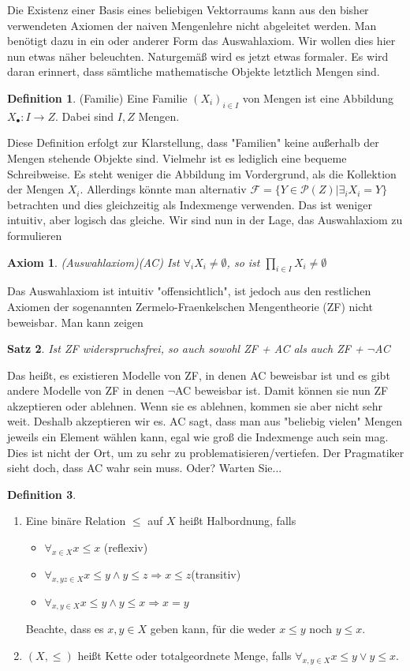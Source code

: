 \documentclass[12pt,a4paper]{article}
\newtheorem{theorem}{Satz}
\newtheorem{axiom}{Axiom}
\theoremstyle{definition}
\newtheorem{definition}[theorem]{Definition}
\theoremstyle{remark}
\begin{document}
		Die Existenz einer Basis eines beliebigen Vektorraums kann aus den bisher verwendeten Axiomen der naiven Mengenlehre nicht abgeleitet werden. Man benötigt dazu in ein oder anderer Form das Auswahlaxiom. Wir wollen dies hier nun etwas näher beleuchten. Naturgemäß wird es jetzt etwas formaler. Es wird daran erinnert, dass sämtliche mathematische Objekte letztlich Mengen sind.
		\begin{definition}{(Familie)}
			Eine Familie $(X_i)_{i \in I}$ von Mengen ist eine Abbildung $X_{\bullet}: I \rightarrow Z$. Dabei sind $I, Z$ Mengen.
		\end{definition}
		Diese Definition erfolgt zur Klarstellung, dass "Familien" keine außerhalb der Mengen stehende Objekte sind.
		Vielmehr ist es lediglich eine bequeme Schreibweise. Es steht weniger die Abbildung im Vordergrund, als die Kollektion der Mengen $X_i$. Allerdings könnte man alternativ $\mathcal{F} = \{ Y \in \mathcal{P}(Z) | \exists_i X_i = Y \}$ betrachten und dies gleichzeitig als Indexmenge verwenden.
		Das ist weniger intuitiv, aber logisch das gleiche.
		Wir sind nun in der Lage, das Auswahlaxiom zu formulieren
		\begin{axiom}{(Auswahlaxiom)(AC)}
			Ist $\forall_i X_i \neq \emptyset$, so ist $\prod_{i \in I} X_i \neq \emptyset$
		\end{axiom}
		Das Auswahlaxiom ist intuitiv "offensichtlich", ist jedoch aus den restlichen Axiomen der sogenannten Zermelo-Fraenkelschen Mengentheorie (ZF) nicht beweisbar. Man kann zeigen
		\begin{theorem}
			Ist ZF widerspruchsfrei, so auch sowohl ZF + AC als auch ZF + $\lnot$AC
		\end{theorem}
		Das heißt, es existieren Modelle von ZF, in denen AC beweisbar ist und es gibt andere Modelle von ZF in denen $\lnot$AC beweisbar ist. Damit können sie nun ZF akzeptieren oder ablehnen. Wenn sie es ablehnen, kommen sie aber nicht sehr weit. Deshalb akzeptieren wir es.
		AC sagt, dass man aus "beliebig vielen" Mengen jeweils ein Element wählen kann, egal wie groß die Indexmenge auch sein mag. Dies ist nicht der Ort, um zu sehr zu problematisieren/vertiefen. Der Pragmatiker sieht doch, dass AC wahr sein muss. Oder? Warten Sie...
		\begin{definition}
			\begin{enumerate}
				\item 
					Eine binäre Relation $\leq$ auf $X$ heißt Halbordnung, falls
					\begin{itemize}
						\item 
							$\forall_{x \in X} x \leq x$ (reflexiv)
						\item
							$\forall_{x,yz \in X} x \leq y \land  y \leq z \Rightarrow x \leq z$(transitiv)
						\item
							$\forall_{x,y \in X} x \leq y \land y \leq x \Rightarrow x =y$
					\end{itemize}
					Beachte, dass es $x,y \in X$ geben kann, für die weder $x \leq y$ noch $y \leq x$.
				\item
					$(X, \leq)$ heißt Kette oder totalgeordnete Menge, falls $\forall_{x,y \in X} x \leq y \lor y \leq x$.
			\end{enumerate}
		\end{definition}
\end{document}
